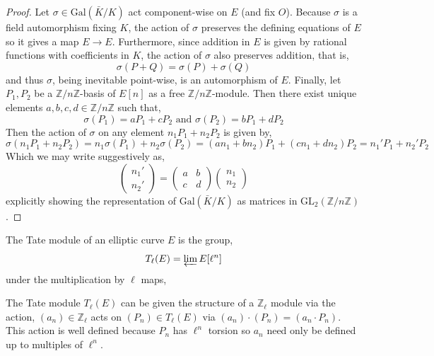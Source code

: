 \documentclass{article}
\newcommand{\Gal}[1]{\mathrm{Gal}\left( #1 \right)}
\newcommand{\GL}[2]{\mathrm{GL}_{#1}\left(#2\right)}
\newcommand{\Z}{\mathbb{Z}}
\theoremstyle{definition}
\newenvironment{definition}[1][Definition:]{\begin{trivlist}
\item[\hskip \labelsep {\bfseries #1}]}{\end{trivlist}}
\begin{document}
\begin{proof}
Let $\sigma \in \Gal{\bar{K} / K}$ act component-wise on $E$ (and fix $O$). Because $\sigma$ is a field automorphism fixing $K$, the action of $\sigma$ preserves the defining equations of $E$ so it gives a map $E \to E$. Furthermore, since addition in $E$ is given by rational functions with coefficients in $K$, the action of $\sigma$ also preserves addition, that is,
\[\sigma(P + Q) = \sigma(P) + \sigma(Q)\] 
and thus $\sigma$, being inevitable point-wise, is an automorphism of $E$. Finally, let $P_1, P_2$ be a $\Z/ n \Z$-basis of $E[n]$ as a free $\Z / n \Z$-module. Then there exist unique elements $a, b, c, d \in \Z / n \Z$ such that,
\[ \sigma(P_1) = a P_1 + c P_2 \text{  and  } \sigma(P_2) = b P_1 + d P_2 \] 
Then the action of $\sigma$ on any element $n_1 P_1 + n_2 P_2$ is given by,
\[ \sigma(n_1 P_1 + n_2 P_2) = n_1 \sigma(P_1) + n_2 \sigma(P_2) = (a n_1 + b n_2) P_1 + (c n_1 + d n_2) P_2 = n_1' P_1 + n_2' P_2 \]
Which we may write suggestively as,
\[
\begin{pmatrix}
n_1'
\\
n_2'
\end{pmatrix} 
= 
\begin{pmatrix}
a & b 
\\
c & d
\end{pmatrix}
\begin{pmatrix}
n_1 
\\
n_2
\end{pmatrix}\]
explicitly showing the representation of $\Gal{\bar{K} / K}$ as matrices in $\GL{2}{\Z / n \Z}$. 
\end{proof}

\begin{definition}
The Tate module of an elliptic curve $E$ is the group,
\[T_{\ell}(E) = \varprojlim E[\ell^n]\]
under the multiplication by $\ell$ maps,
\begin{center}
\end{center}
The Tate module $T_{\ell}(E)$ can be given the structure of a $\Z_{\ell}$ module via the action, $(a_n) \in \Z_{\ell}$ acts on $(P_n) \in T_{\ell}(E)$ via $(a_n) \cdot (P_n) = (a_n \cdot P_n)$. This action is well defined because $P_n$ has $\ell^n$ torsion so $a_n$ need only be defined up to multiples of $\ell^n$.  
\end{definition}
\end{document}
